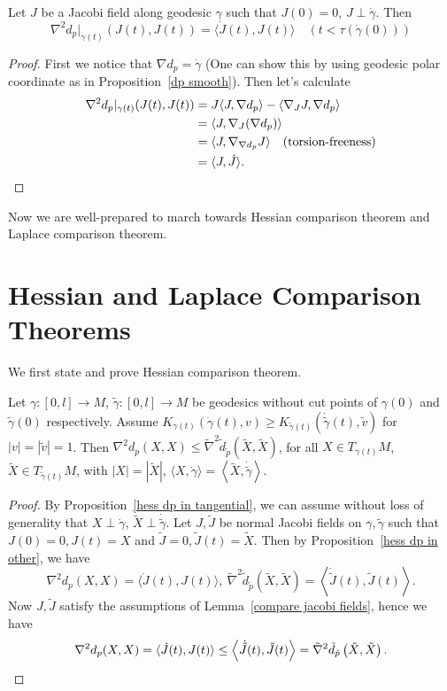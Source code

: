 \begin{prop}\label{hess dp in other}
    Let $J$ be a Jacobi field along geodesic $\gamma$ such that $J(0)=0$, $J\perp\dot{\gamma}$.
    Then
    \[\nabla^2d_p|_{\gamma(t)}(J(t),J(t))=\langle\dot{J}(t),J(t)\rangle\quad(t<\tau(\dot{\gamma}(0)))\]
\end{prop}
\begin{proof}
    First we notice that $\nabla d_p=\dot{\gamma}$ (One can show this by using geodesic polar coordinate as in Proposition~\ref{dp smooth}).
    Then let's calculate
    \begin{align*}
        \nabla^2d_p|_{\gamma(t)}(J(t),J(t))&=J\langle J,\nabla d_p\rangle-\langle\nabla_JJ,\nabla d_p\rangle\\
        &=\langle J,\nabla_J(\nabla d_p)\rangle\\
        &=\langle J,\nabla_{\nabla d_p}J\rangle\quad\text{(torsion-freeness)}\\
        &=\langle J,\dot{J}\rangle.\qedhere
    \end{align*}
\end{proof}

Now we are well-prepared to march towards Hessian comparison theorem and Lap\-lace comparison theorem.

\section{Hessian and Laplace Comparison Theorems}

We first state and prove Hessian comparison theorem.
\begin{thm}
    Let $\gamma:[0,l]\to M$, $\tilde{\gamma}:[0,l]\to M$ be geodesics without cut points of $\gamma(0)$ and $\tilde{\gamma}(0)$ respectively.
    Assume $K_{\gamma(t)}(\dot{\gamma}(t),v)\geq K_{\tilde{\gamma}(t)}\left(\dot{\tilde{\gamma}}(t),\tilde{v}\right)$ for $|v|=|\tilde{v}|=1$.
    Then $\nabla^2d_p(X,X)\leq\tilde{\nabla}^2\tilde{d}_{\tilde{p}}\left(\tilde{X},\tilde{X}\right)$, for all $X\in T_{\gamma(t)}M$, $\tilde{X}\in T_{\tilde{\gamma}(t)}M$, with $|X|=|\tilde{X}|$, $\langle X,\dot{\gamma}\rangle=\left\langle\tilde{X},\dot{\tilde{\gamma}}\right\rangle$.
\end{thm}
\begin{proof}
    By Proposition~\ref{hess dp in tangential}, we can assume without loss of generality that $X\perp\dot{\gamma}$, $\tilde{X}\perp\dot{\tilde{\gamma}}$.
    Let $J,\tilde{J}$ be normal Jacobi fields on $\gamma,\tilde{\gamma}$ such that $J(0)=0,J(t)=X$ and $\tilde{J}=0,\tilde{J}(t)=\tilde{X}$.
    Then by Proposition~\ref{hess dp in other}, we have
    \[\nabla^2d_p(X,X)=\langle\dot{J}(t),J(t)\rangle,\ \tilde{\nabla}^2\tilde{d}_{\tilde{p}}\left(\tilde{X},\tilde{X}\right)=\left\langle\dot{\tilde{J}}(t),\tilde{J}(t)\right\rangle.\]
    Now $J,\tilde{J}$ satisfy the assumptions of Lemma~\ref{compare jacobi fields}, hence we have
    \[\nabla^2d_p(X,X)=\langle\dot{J}(t),J(t)\rangle\leq\left\langle\dot{\tilde{J}}(t),\tilde{J}(t)\right\rangle=\tilde{\nabla}^2\tilde{d}_{\tilde{p}}\left(\tilde{X},\tilde{X}\right).\qedhere\]
\end{proof}

